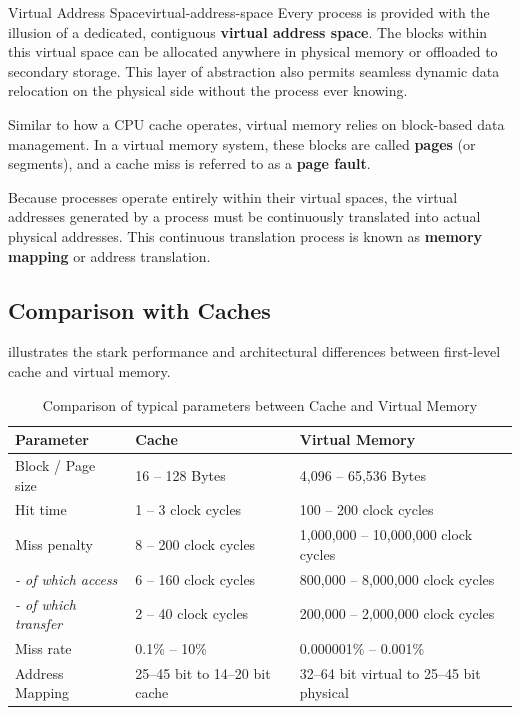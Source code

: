 \begin{concept}{Virtual Address Space}{virtual-address-space}
    Every process is provided with the illusion of a dedicated, contiguous \textbf{virtual address space}. The blocks within this virtual space can be allocated anywhere in physical memory or offloaded to secondary storage. This layer of abstraction also permits seamless dynamic data relocation on the physical side without the process ever knowing.
\end{concept}

Similar to how a CPU cache operates, virtual memory relies on block-based data management. In a virtual memory system, these blocks are called \textbf{pages} (or segments), and a cache miss is referred to as a \textbf{page fault}. 

Because processes operate entirely within their virtual spaces, the virtual addresses generated by a process must be continuously translated into actual physical addresses. This continuous translation process is known as \textbf{memory mapping} or address translation.

\subsection{Comparison with Caches}

 illustrates the stark performance and architectural differences between first-level cache and virtual memory. 

\begin{table}[htb!]
    \centering
    \renewcommand{\arraystretch}{1.2}
    \begin{tabular}{l l l}
        \hline
        \textbf{Parameter} & \textbf{Cache} & \textbf{Virtual Memory}\\
        \hline 
        Block / Page size & 16 -- 128 Bytes & 4,096 -- 65,536 Bytes\\
        Hit time & 1 -- 3 clock cycles & 100 -- 200 clock cycles \\
        Miss penalty & 8 -- 200 clock cycles & 1,000,000 -- 10,000,000 clock cycles \\
        \hspace{3mm} \textit{- of which access} & 6 -- 160 clock cycles & 800,000 -- 8,000,000 clock cycles\\
        \hspace{3mm} \textit{- of which transfer} & 2 -- 40 clock cycles & 200,000 -- 2,000,000 clock cycles \\
        Miss rate & 0.1\% -- 10\% & 0.000001\% -- 0.001\% \\
        Address Mapping & 25--45 bit to 14--20 bit cache & 32--64 bit virtual to 25--45 bit physical \\
        \hline
    \end{tabular}
    \caption{Comparison of typical parameters between Cache and Virtual Memory}
    \label{tab:cache-vs-virtual-memory}
\end{table}

